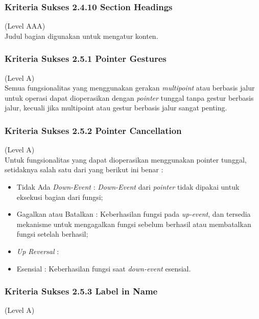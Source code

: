\subsubsection{Kriteria Sukses 2.4.10 Section Headings}
\label{subsubsec:kriteria_2.4.10}
(Level AAA) \\

Judul bagian digunakan untuk mengatur konten.

\subsubsection{Kriteria Sukses 2.5.1 Pointer Gestures}
\label{subsubsec:kriteria_2.5.1}
(Level A) \\

Semua fungsionalitas yang menggunakan gerakan \textit{multipoint} atau berbasis jalur untuk operasi dapat dioperasikan dengan \textit{pointer} tunggal tanpa gestur berbasis jalur, kecuali jika multipoint atau gestur berbasis jalur sangat penting.

\subsubsection{Kriteria Sukses 2.5.2 Pointer Cancellation}
\label{subsubsec:kriteria_2.5.2}
(Level A) \\

Untuk fungsionalitas yang dapat dioperasikan menggunakan pointer tunggal, setidaknya salah satu dari yang berikut ini benar :

\begin{itemize}
	\item Tidak Ada \textit{Down-Event} : \textit{Down-Event} dari \textit{pointer} tidak dipakai untuk eksekusi bagian dari fungsi;
	\item Gagalkan atau Batalkan : Keberhasilan fungsi pada \textit{up-event}, dan tersedia mekanisme untuk mengagalkan fungsi sebelum berhasil atau membatalkan fungsi setelah berhasil;
	\item \textit{Up Reversal} : 
	\item Esensial : Keberhasilan fungsi saat \textit{down-event} esensial.
\end{itemize}

\subsubsection{Kriteria Sukses 2.5.3 Label in Name}
\label{subsubsec:kriteria_2.5.3}
(Level A) \\

